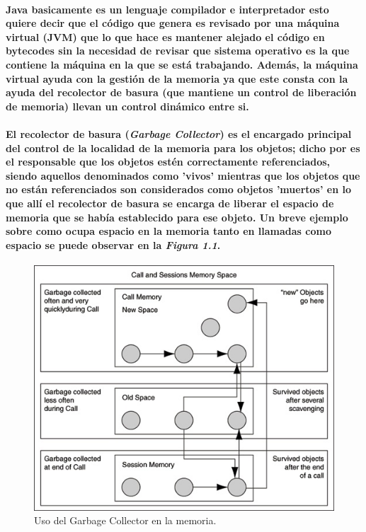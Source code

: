 \documentclass[12pt]{book} %
\begin{document}
\paragraph{Java basicamente es un lenguaje compilador e interpretador \cite{ob} esto quiere decir que el c\'odigo que genera es revisado por una m\'aquina virtual (JVM) que lo que hace es mantener alejado el c\'odigo en bytecodes sin la necesidad de revisar que sistema operativo es la que contiene la m\'aquina en la que se est\'a trabajando. Adem\'as, la m\'aquina virtual ayuda con la gesti\'on de la memoria ya que este consta con la ayuda del recolector de basura (que mantiene un control de liberaci\'on de memoria) llevan un control din\'amico entre si.}

\paragraph{El recolector de basura (\textsl{Garbage Collector}) es el encargado principal del control de la localidad de la memoria para los objetos; dicho por \cite{sun} es el responsable que los objetos est\'en correctamente referenciados, siendo aquellos denominados como 'vivos' mientras que los objetos que no est\'an referenciados son considerados como objetos 'muertos' en lo que all\'i el recolector de basura se encarga de liberar el espacio de memoria que se hab\'ia establecido para ese objeto. Un breve ejemplo sobre como ocupa espacio en la memoria tanto en llamadas como espacio se puede observar en la \textsl{Figura 1.1}.}

\begin{figure}[h!]
	\begin{center}
	\includegraphics[scale=0.5]{garbage.jpg}
	\end{center}
	\caption{Uso del Garbage Collector en la memoria.}
\end{figure}~\\[2cm]
\end{document}
